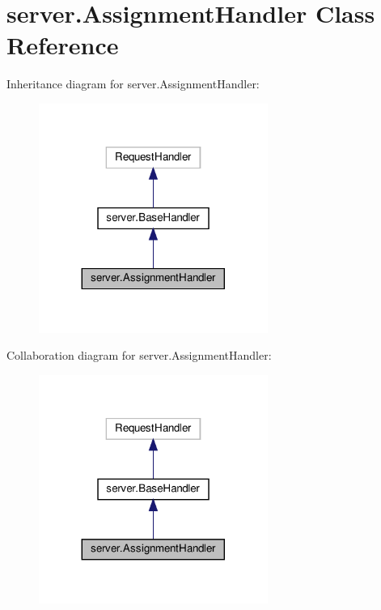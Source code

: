 \hypertarget{classserver_1_1AssignmentHandler}{}\section{server.\+Assignment\+Handler Class Reference}
\label{classserver_1_1AssignmentHandler}


Inheritance diagram for server.\+Assignment\+Handler\+:
\nopagebreak
\begin{figure}[H]
\begin{center}
\leavevmode
\includegraphics[width=212pt]{classserver_1_1AssignmentHandler__inherit__graph}
\end{center}
\end{figure}


Collaboration diagram for server.\+Assignment\+Handler\+:
\nopagebreak
\begin{figure}[H]
\begin{center}
\leavevmode
\includegraphics[width=212pt]{classserver_1_1AssignmentHandler__coll__graph}
\end{center}
\end{figure}
